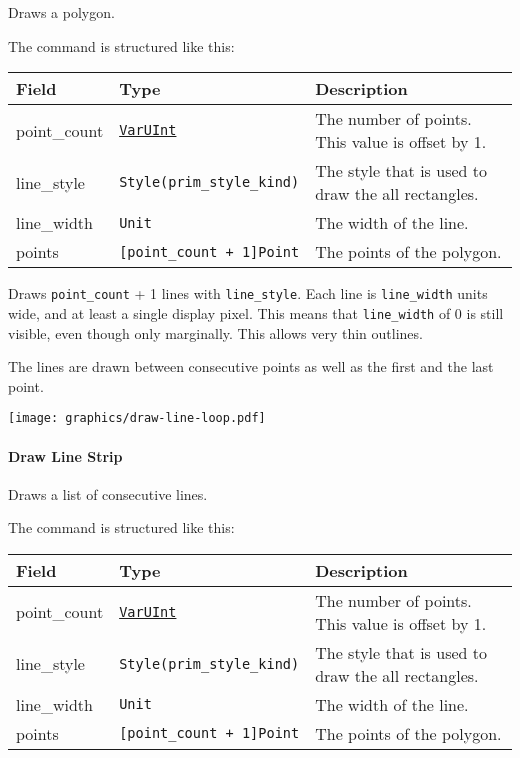 \documentclass[]{article}
\begin{document}
Draws a polygon.

The command is structured like this:

\begin{longtable}[]{@{}p{1in}p{2in}p{3in}@{}}
\toprule
Field & Type & Description \\
\midrule
\endhead
point\_count & \protect\hyperlink{varuint}{\texttt{VarUInt}} & The
number of points. This value is offset by 1. \\
line\_style & \texttt{Style(prim\_style\_kind)} & The style that is
used to draw the all rectangles. \\
line\_width & \texttt{Unit} & The width of the line. \\
points & \texttt{{[}point\_count\ +\ 1{]}Point} & The points of the
polygon. \\
\bottomrule
\end{longtable}

Draws \texttt{point\_count} + 1 lines with \texttt{line\_style}. Each
line is \texttt{line\_width} units wide, and at least a single display
pixel. This means that \texttt{line\_width} of 0 is still visible, even
though only marginally. This allows very thin outlines.

The lines are drawn between consecutive points as well as the first and
the last point.

\begin{center}
\texttt{[image: graphics/draw-line-loop.pdf]}
\end{center}

\hypertarget{draw-line-strip}{\paragraph{Draw Line Strip}\label{draw-line-strip}}

Draws a list of consecutive lines.

The command is structured like this:

\begin{longtable}[]{@{}p{1in}p{2in}p{3in}@{}}
\toprule
Field & Type & Description \\
\midrule
\endhead
point\_count & \protect\hyperlink{varuint}{\texttt{VarUInt}} & The
number of points. This value is offset by 1. \\
line\_style & \texttt{Style(prim\_style\_kind)} & The style that is
used to draw the all rectangles. \\
line\_width & \texttt{Unit} & The width of the line. \\
points & \texttt{{[}point\_count\ +\ 1{]}Point} & The points of the
polygon. \\
\bottomrule
\end{longtable}
\end{document}
